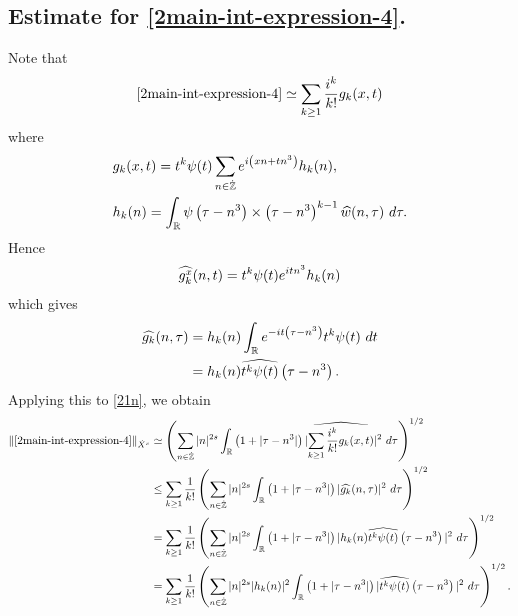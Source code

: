 \subsection{Estimate for \ref{2main-int-expression-4}.}
Note that
%
%
\begin{equation}
	\label{21n}
	\begin{split}
		\eqref{2main-int-expression-4} \simeq \sum_{k \ge 1}
		\frac{i^k}{k!}g_k(x,t)
	\end{split}
\end{equation}
%
%
where 
%
%
\begin{equation*}
	\begin{split}
		& g_k(x,t) = t^k \psi(t) \sum_{n \in \dot{\mathbb{Z}}} e^{i\left( xn + tn^{3}
		\right)} h_k(n),
		\\
		& h_k(n) = \int_{\mathbb{R}} \psi \left( \tau - n^3 \right) \times \left(
		\tau - n^3 \right)^{k -1} \widehat{w}(n, \tau) \ d \tau.
	\end{split}
\end{equation*}
%
%
Hence
%
%
\begin{equation*}
	\begin{split}
		\widehat{g_k^x}(n, t) = t^{k} \psi(t) e^{i t n^3} h_k(n)
	\end{split}
\end{equation*}
%
%
which gives
%
%
\begin{equation*}
	\begin{split}
		\widehat{g_k}(n, \tau)
		& = h_k(n) \int_{\mathbb{R}} e^{-it\left( \tau - n^3 \right)}
		t^{k}\psi(t) \ dt
		\\
		& = h_k(n) \widehat{t^{k}\psi(t)} \left( \tau - n^3 \right).
	\end{split}
\end{equation*}
%
%
Applying this to \eqref{21n}, we obtain
%
%
\begin{equation}
	\label{22n}
	\begin{split}
		\|\eqref{2main-int-expression-4}\|_{\dot{X}^s} 
		& \simeq \left( \sum_{n \in \dot{\mathbb{Z}}} |n|^{2s} \int_{\mathbb{R}} \left( 1 + | \tau -
		n^3
		|
		\right) | \widehat{\sum_{k \ge 1} \frac{i^k}{k!}g_k(x,t)} |^2 \ d \tau
		\right)^{1/2}
		\\
		& \le \sum_{k \ge 1} \frac{1}{k!}\left( \sum_{n \in \dot{\mathbb{Z}}} |n|^{2s}
		\int_{\mathbb{R}} \left( 1 + | \tau - n^3 | \right) | \widehat{g_k}(n, \tau) |^2 \
		d \tau \right)^{1/2}
		\\
		& = \sum_{k \ge 1} \frac{1}{k!} \left( \sum_{n \in \dot{\mathbb{Z}}} |n|^{2s}
		\int_{\mathbb{R}} \left( 1 + | \tau - n^3 | \right) | h_k(n) \widehat{t^k
		\psi(t)} \left( \tau - n^3 \right) |^2 \ d \tau \right)^{1/2}
		\\
		& = \sum_{k \ge 1} \frac{1}{k!} \left( \sum_{n \in \dot{\mathbb{Z}}} |n|^{2s} |
		h_k(n) |^2 \int_{\mathbb{R}} \left( 1 + | \tau - n^3 | \right) | \widehat{t^k
		\psi(t)} \left( \tau - n^3 \right) |^2 \ d \tau \right)^{1/2}.
	\end{split}
\end{equation}
